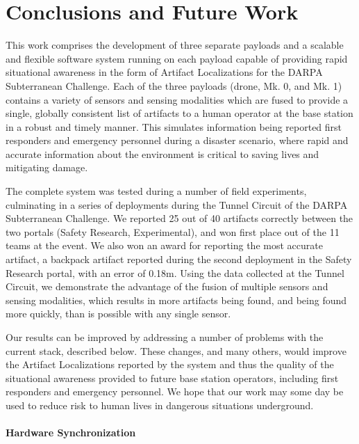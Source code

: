 \chapter{Conclusions and Future Work}

This work comprises the development of three separate payloads and a scalable and flexible software system running on each payload capable of providing rapid situational awareness in the form of Artifact Localizations for the DARPA Subterranean Challenge. Each of the three payloads (drone, Mk. 0, and Mk. 1) contains a variety of sensors and sensing modalities which are fused to provide a single, globally consistent list of artifacts to a human operator at the base station in a robust and timely manner. This simulates information being reported first responders and emergency personnel during a disaster scenario, where rapid and accurate information about the environment is critical to saving lives and mitigating damage.

The complete system was tested during a number of field experiments, culminating in a series of deployments during the Tunnel Circuit of the DARPA Subterranean Challenge. We reported 25 out of 40 artifacts correctly between the two portals (Safety Research, Experimental), and won first place out of the 11 teams at the event. We also won an award for reporting the most accurate artifact, a backpack artifact reported during the second deployment in the Safety Research portal, with an error of 0.18m. Using the data collected at the Tunnel Circuit, we demonstrate the advantage of the fusion of multiple sensors and sensing modalities, which results in more artifacts being found, and being found more quickly, than is possible with any single sensor. 

Our results can be improved by addressing a number of problems with the current stack, described below. These changes, and many others, would improve the Artifact Localizations reported by the system and thus the quality of the situational awareness provided to future base station operators, including first responders and emergency personnel. We hope that our work may some day be used to reduce risk to human lives in dangerous situations underground.

\subsubsection{Hardware Synchronization}

